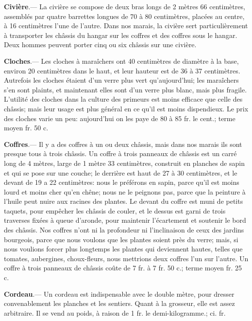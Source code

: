 \documentclass[10pt,a4paper]{book}
\begin{document}
\textbf{Civière}.--- La civière se compose de deux bras longs de 2 mètres 66 centimètres, assemblés par quatre barrettes longues de 70 à 80 centimètres, placées au centre, à 16 centimètres l'une de l'autre. Dans nos marais, la civière sert particulièrement à transporter les châssis du hangar sur les coffres et des coffres sous le hangar. Deux hommes peuvent porter cinq ou six châssis sur une civière.

\textbf{Cloches}.--- Les cloches à maraîchers ont 40 centimètres de diamètre à la base, environ 20 centimètres dans le haut, et leur hauteur est de 36 à 37 centimètres. Autrefois les cloches étaient d'un verre plus vert qu'aujourd'hui; les maraîchers s'en sont plaints, et maintenant elles sont d'un verre plus blanc, mais plus fragile. L'utilité des cloches dans la culture des primeurs est moins efficace que celle des châssis; mais leur usage est plus général en ce qu'il est moins dispendieux. Le prix des cloches varie un peu: aujourd'hui on les paye de 80 à 85 fr. le cent.; terme moyen  fr. 50 c.

\textbf{Coffres}.--- Il y a des coffres à un ou deux châssis, mais dans nos marais ils sont presque tous à trois châssis. Un coffre à trois panneaux de châssis est un carré long de 4 mètres, large de 1 mètre 33 centimètres, construit en planches de sapin et qui se pose sur une couche; le derrière est haut de 27 à 30 centimètres, et le devant de 19 a 22 centimètres: nous le préférons en sapin, parce qu'il est moins lourd et moins cher qu'en chêne; nous ne le peignons pas, parce que la peinture à l'huile peut nuire aux racines des plantes. Le devant du coffre est muni de petits taquets, pour empêcher les châssis de couler, et le dessus est garni de trois traverses fixées à queue d'aronde, pour maintenir l'écartement et soutenir le bord des châssis. Nos coffres n'ont ni la profondeur ni l'inclinaison de ceux des jardins bourgeois, parce que nous voulons que les plantes soient près du verre; mais, si nous voulions forcer plus longtemps les plantes qui deviennent hautes, telles que tomates, aubergines, choux-fleurs, nous mettrions deux coffres l'un sur l'autre. Un coffre à trois panneaux de châssis coûte de 7 fr. à 7 fr. 50 c.; terme moyen  fr. 25 c.

\textbf{Cordeau}.--- Un cordeau est indispensable avec le double mètre, pour dresser convenablement les planches et les sentiers. Quant à la grosseur, elle est assez arbitraire. Il se vend au poids, à raison de 1 fr. le demi-kilogramme.; ci. fr.
\end{document}
